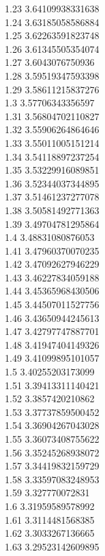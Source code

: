 {1.23	3.64109938331638\\
1.24	3.63185058586884\\
1.25	3.62263591823748\\
1.26	3.61345505354074\\
1.27	3.6043076750936\\
1.28	3.59519347593398\\
1.29	3.58611215837276\\
1.3	3.57706343356597\\
1.31	3.56804702110827\\
1.32	3.55906264864646\\
1.33	3.55011005151214\\
1.34	3.54118897237254\\
1.35	3.53229916089851\\
1.36	3.52344037344895\\
1.37	3.51461237277078\\
1.38	3.50581492771363\\
1.39	3.49704781295864\\
1.4	3.48831080876053\\
1.41	3.47960370070235\\
1.42	3.47092627946229\\
1.43	3.46227834059188\\
1.44	3.45365968430506\\
1.45	3.44507011527756\\
1.46	3.43650944245613\\
1.47	3.42797747887701\\
1.48	3.41947404149326\\
1.49	3.41099895101057\\
1.5	3.40255203173099\\
1.51	3.39413311140421\\
1.52	3.3857420210862\\
1.53	3.37737859500452\\
1.54	3.36904267043028\\
1.55	3.36073408755622\\
1.56	3.35245268938072\\
1.57	3.34419832159729\\
1.58	3.33597083248953\\
1.59	3.327770072831\\
1.6	3.31959589578992\\
1.61	3.3114481568385\\
1.62	3.3033267136665\\
1.63	3.29523142609895\\
}
